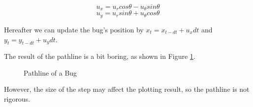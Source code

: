 \documentclass{article}
\begin{document}
  $$u_x = u_rcos\theta - u_{\theta}sin\theta$$
  $$u_y = u_rsin\theta + u_{\theta}cos\theta$$
  
  Hereafter we can update the bug's position by $x_t = x_{t-dt} + u_x dt$ and $y_t = y_{t-dt} + u_y dt$.
  
  
  The result of the pathline is a bit boring, as shown in Figure \ref{fig:pathline}.
  \begin{figure}[H]
    \centering
    \noindent{}
    \caption{Pathline of a Bug} \label{fig:pathline}
  \end{figure}
  However, the size of the step may affect the plotting result, so the pathline is not rigorous.

  
\clearpage %
%
%
%
\end{document}
